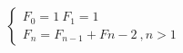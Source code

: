 \documentclass[preview]{standalone}
\begin{document}
\begin{align*}
\begin{cases}F_0 = 1 \: F_1 = 1\\F_n = F_{n - 1} + F{n - 2} \:, n > 1\end{cases}
\end{align*}
\end{document}
